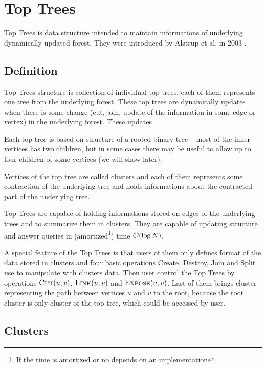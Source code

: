 \chapter{Top Trees}

Top Trees is data structure intended to maintain informations of underlying
dynamically updated forest. They were introduced by Alstrup et al. in 2003 \cite{TopTrees}.

\section{Definition}

{\I Top Trees structure} is collection of individual {\I top trees}, each of them
represents one tree from the underlying forest. These top trees are dynamically
updates when there is some change (cut, join, update of the information in some
edge or vertex) in the underlying forest. These updates

Each {\I top tree \TT} is based on structure of a rooted binary tree -- most of
the inner vertices has two children, but in some cases there may be useful to
allow up to four children of some vertices (we will show later).

Vertices of the top tree are called {\I clusters} and each of them represents
some contraction of the underlying tree and holds informations about the
contracted part of the underlying tree.

Top Trees are capable of holding informations stored on edges of the underlying
trees and to summarize them in clusters. They are capable of updating structure
and answer queries in (amortized\footnote{If the time is amortized or no
depends on an implementation}) time ${\cal O}(\log N)$.

A special feature of the Top Trees is that users of them only defines format of
the data stored in clusters and four basic operations {\sc Create}, {\sc
Destroy}, {\sc Join} and {\sc Split} use to manipulate with clusters data. Then
user control the Top Trees by operations $\hbox{\sc Cut}(u,v)$,
$\hbox{\sc Link}(u,v)$ and $\hbox{\sc Expose}(u,v)$. Last of them brings cluster
representing the path between vertices $u$ and $v$ to the root, because the root
cluster is only cluster of the top tree, which could be accessed by user.

\section{Clusters}

